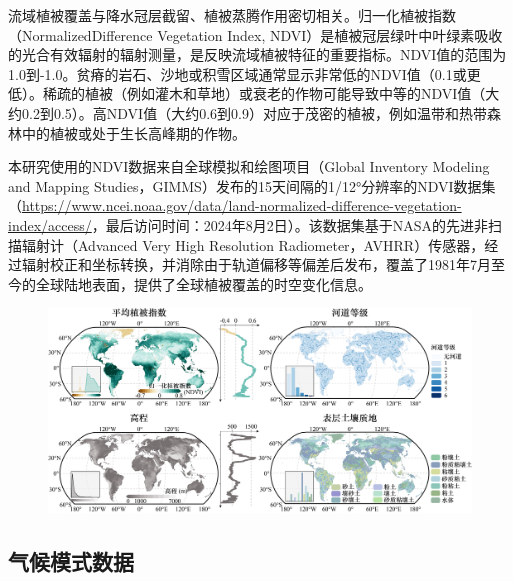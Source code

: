 流域植被覆盖与降水冠层截留、植被蒸腾作用密切相关。归一化植被指数（NormalizedDifference Vegetation Index, NDVI）是植被冠层绿叶中叶绿素吸收的光合有效辐射的辐射测量，是反映流域植被特征的重要指标。NDVI值的范围为1.0到-1.0。贫瘠的岩石、沙地或积雪区域通常显示非常低的NDVI值（0.1或更低）。稀疏的植被（例如灌木和草地）或衰老的作物可能导致中等的NDVI值（大约0.2到0.5）。高NDVI值（大约0.6到0.9）对应于茂密的植被，例如温带和热带森林中的植被或处于生长高峰期的作物。\par
本研究使用的NDVI数据来自全球模拟和绘图项目（Global Inventory Modeling and Mapping Studies，GIMMS）发布的15天间隔的1/12°分辨率的NDVI数据集（\href{https://www.ncei.noaa.gov/data/land-normalized-difference-vegetation-index/access/}{https://www.ncei.noaa.gov/data/land-normalized-difference-vegetation-index/access/}，最后访问时间：2024年8月2日）。该数据集基于NASA的先进非扫描辐射计（Advanced Very High Resolution Radiometer，AVHRR）传感器，经过辐射校正和坐标转换，并消除由于轨道偏移等偏差后发布，覆盖了1981年7月至今的全球陆地表面，提供了全球植被覆盖的时空变化信息。

\begin{figure}[H]
	\centering
	\includegraphics[width=1\textwidth]{figures/chap2/Global_Underlying.jpg}
	\label{fig:Global_Underlying_Data}
\end{figure}

\subsection{气候模式数据}

